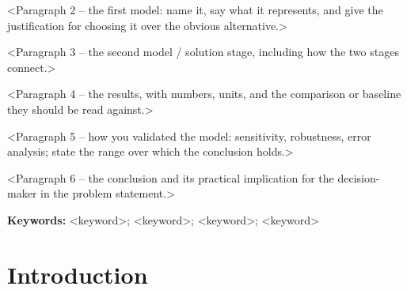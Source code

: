 \documentclass[12pt]{article}            %
\theoremstyle{definition}
\theoremstyle{remark}
\begin{document}
<Paragraph 2 -- the first model: name it, say what it represents, and give the
justification for choosing it over the obvious alternative.>

<Paragraph 3 -- the second model / solution stage, including how the two stages
connect.>

<Paragraph 4 -- the results, with numbers, units, and the comparison or baseline
they should be read against.>

<Paragraph 5 -- how you validated the model: sensitivity, robustness, error
analysis; state the range over which the conclusion holds.>

<Paragraph 6 -- the conclusion and its practical implication for the
decision-maker in the problem statement.>

\vspace{1ex}
\noindent\textbf{Keywords:} <keyword>; <keyword>; <keyword>; <keyword>

\clearpage
\pagestyle{fancy}
\tableofcontents
\newpage


\section{Introduction}
\end{document}

